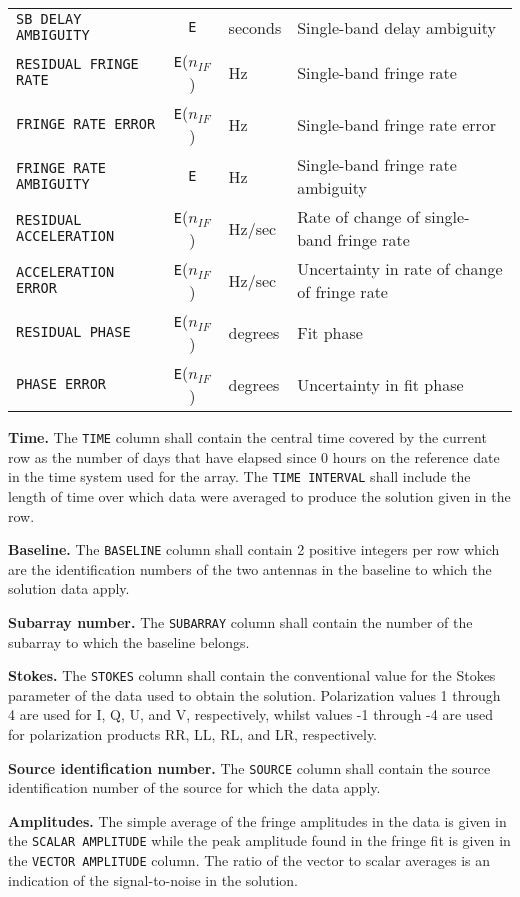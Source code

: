 \documentclass[twoside]{article}
\newcommand{\nif}{$n_{IF}$}
\begin{document}
\begin{center}
\begin{tabular}{lcll}
{\tt SB DELAY AMBIGUITY}    & {\tt E}       & seconds & Single-band delay ambiguity \\
{\tt RESIDUAL FRINGE RATE}  & {\tt E}(\nif) & Hz & Single-band fringe rate \\
{\tt FRINGE RATE ERROR}     & {\tt E}(\nif) & Hz & Single-band fringe rate error \\
{\tt FRINGE RATE AMBIGUITY} & {\tt E}       & Hz & Single-band fringe rate ambiguity \\
{\tt RESIDUAL ACCELERATION} & {\tt E}(\nif) & Hz/sec & Rate of change of single-band fringe rate \\
{\tt ACCELERATION ERROR}    & {\tt E}(\nif) & Hz/sec & Uncertainty in rate of change of fringe rate \\
{\tt RESIDUAL PHASE}        & {\tt E}(\nif) & degrees & Fit phase \\
{\tt PHASE ERROR}           & {\tt E}(\nif) & degrees & Uncertainty in fit phase
\end{tabular}
\end{center}

{\bf Time.}  The {\tt TIME} column shall contain the central time
covered by the current row as the number of days that have elapsed
since 0 hours on the reference date in the time system used for the
array.  The {\tt TIME INTERVAL} shall include the length of time over
which data were averaged to produce the solution given in the row.

{\bf Baseline.} The {\tt BASELINE} column shall contain 2 positive
integers per row which are the identification numbers of the two
antennas in the baseline to which the solution data apply.

{\bf Subarray number.} The {\tt SUBARRAY} column shall contain the
number of the subarray to which the baseline belongs.

{\bf Stokes.} The {\tt STOKES} column shall contain the conventional
value for the Stokes parameter of the data used to obtain the
solution.  Polarization values 1 through 4 are used for I, Q, U, and
V, respectively, whilst values -1 through -4 are used for polarization
products RR, LL, RL, and LR, respectively.

{\bf Source identification number.}  The {\tt SOURCE} column shall
contain the source identification number of the source for which the
data apply.

{\bf Amplitudes.} The simple average of the fringe amplitudes in the
data is given in the {\tt SCALAR AMPLITUDE} while the peak amplitude
found in the fringe fit is given in the {\tt VECTOR AMPLITUDE} column.
The ratio of the vector to scalar averages is an indication of the
signal-to-noise in the solution.
\end{document}
